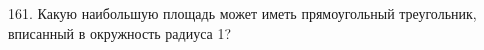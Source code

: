 161. Какую наибольшую площадь может иметь прямоугольный треугольник, вписанный в окружность радиуса 1?\\
